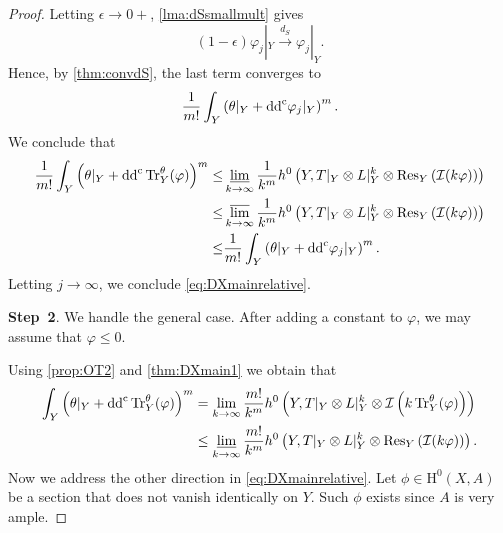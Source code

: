 \begin{proof}
Letting $\epsilon\to0+$, \cref{lma:dSsmallmult} gives
\[
    (1-\epsilon)\varphi_j|_Y\xrightarrow{d_S}\varphi_j|_Y.
\]
Hence, by \cref{thm:convdS}, the last term converges to
\[
    \frac{1}{m!}\int_Y \left(\theta|_Y+\mathrm{dd}^{\mathrm{c}}\varphi_j|_Y\right)^m.
\]
We conclude that
\[
\begin{aligned}
\frac{1}{m!}\int_Y \left(\theta|_Y+\mathrm{dd}^{\mathrm{c}}\operatorname{Tr}_Y^{\theta}(\varphi)\right)^m\leq & \varliminf_{k \to \infty} \frac{1}{k^m} h^0\left(Y, T|_Y\otimes L|_Y^k\otimes \operatorname{Res}_Y\left(\mathcal{I}(k\varphi)\right)\right) \\
\leq & \varlimsup_{k \to \infty} \frac{1}{k^m} h^0\left(Y, T|_Y\otimes L|_Y^k\otimes \operatorname{Res}_Y\left(\mathcal{I}(k\varphi)\right)\right)\\
\leq & \frac{1}{m!} \int_Y \left(\theta|_Y+\mathrm{dd}^{\mathrm{c}}\varphi_j|_Y\right)^m.
\end{aligned}
\]
Letting $j\to \infty$, we conclude \eqref{eq:DXmainrelative}.

\textbf{Step~2}. We handle the general case. After adding a constant to $\varphi$, we may assume that $\varphi\leq 0$.

Using \cref{prop:OT2} and \cref{thm:DXmain1} we obtain that
\[
\begin{aligned}
    \int_Y \left(\theta|_Y+\mathrm{dd}^{\mathrm{c}} \operatorname{Tr}_Y^{\theta}(\varphi)\right)^m &= \lim_{k \to \infty} \frac{m!}{k^m} h^0\left(Y,T|_Y \otimes L|_Y^k \otimes \mathcal{I}\left(k\operatorname{Tr}_Y^{\theta}(\varphi)\right)\right)\\
    & \leq \varliminf_{k \to \infty} \frac{m!}{k^m} h^0\left(Y,T|_Y \otimes L|_Y^k \otimes \operatorname{Res}_Y\left(\mathcal{I}(k\varphi)\right)\right).
\end{aligned}
\]
Now we address the other direction in \eqref{eq:DXmainrelative}. Let $\phi \in \mathrm{H}^0(X,A)$ be a section that does not vanish identically on $Y$. Such $\phi$ exists since $A$ is very ample.


\end{proof}
